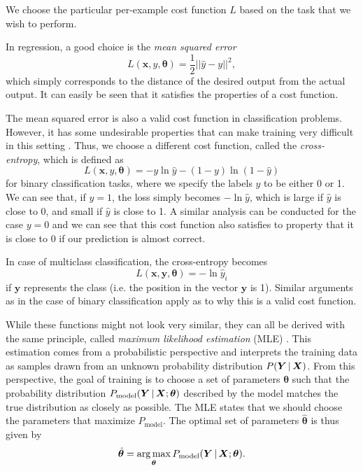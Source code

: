 We choose the particular per-example cost function $L$ based on the task that we wish to perform.

In regression, a good choice is the \emph{mean squared error}
\begin{equation}
L(\bm{x}, y, \bm{\theta}) = \frac1{2}||\hat{y}-y||^2,
\end{equation}
which simply corresponds to the distance of the desired output from the actual output. It can easily be seen that it satisfies the properties of a cost function.

The mean squared error is also a valid cost function in classification problems. However, it has some undesirable properties that can make training very difficult in this setting \cite[Ch.\,6,\,p.\,178]{DBLP:books/daglib/0040158}. Thus, we choose a different cost function, called the \emph{cross-entropy}, which is defined as
\begin{equation}
L(\bm{x}, y, \bm{\theta}) = -y \ln \hat{y} - (1-y)\ln(1-\hat{y})
\end{equation}
for binary classification tasks, where we specify the labels $y$ to be either 0 or 1. We can see that, if $y=1$, the loss simply becomes $-\ln\hat{y}$, which is large if $\hat{y}$ is close to 0, and small if $\hat{y}$ is close to 1. A similar analysis can be conducted for the case $y=0$ and we can see that this cost function also satisfies to property that it is close to 0 if our prediction is almost correct.

In case of multiclass classification, the cross-entropy becomes
\begin{equation}
L(\bm{x}, \bm{y}, \bm{\theta}) = -\ln \hat{y}_i
\end{equation}
if $\bm{y}$ represents the  class (i.e. the  position in the vector $\bm{y}$ is 1). Similar arguments as in the case of binary classification apply as to why this is a valid cost function.

While these functions might not look very similar, they can all be derived with the same principle, called \emph{maximum likelihood estimation} (MLE) \cite[Ch.\,5,\,pp.\,128-131]{DBLP:books/daglib/0040158}. This estimation comes from a probabilistic perspective and interprets the training data as samples drawn from an unknown probability distribution $P(\bm{Y}\,|\,\bm{X})$. From this perspective, the goal of training is to choose a set of parameters $\bm{\theta}$ such that the probability distribution $P_{\text{model}}(\bm{Y}\,|\,\bm{X}; \bm{\theta})$ described by the model matches the true distribution as closely as possible. The MLE states that we should choose the parameters that maximize $P_{\text{model}}$. The optimal set of parameters $\hat{\bm{\theta}}$ is thus given by
\begin{equation}
\hat{\bm{\theta}} = \operatorname*{arg\,max}_{\bm{\theta}} P_{\text{model}}(\bm{Y}\,|\,\bm{X}; \bm{\theta}).
\end{equation}

